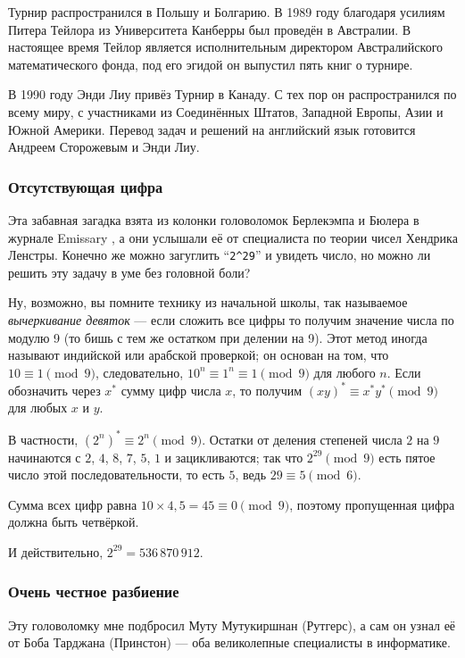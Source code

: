 Турнир распространился в Польшу и Болгарию.
В 1989 году благодаря усилиям Питера Тейлора из Университета Канберры был проведён в Австралии.
В настоящее время Тейлор является исполнительным директором Австралийского математического фонда, под его эгидой он выпустил пять книг о турнире.

В 1990 году Энди Лиу привёз Турнир в Канаду.
С тех пор он распространился по всему миру, с участниками из Соединённых Штатов, Западной Европы, Азии и Южной Америки.
Перевод задач и решений на английский язык готовится Андреем Сторожевым и Энди Лиу.

\subsubsection*{Отсутствующая цифра}

Эта забавная загадка взята из колонки головоломок Берлекэмпа и Бюлера в журнале Emissary \cite[весна/осень 2006 года]{3},
а они услышали её от специалиста по теории чисел Хендрика Ленстры.
Конечно же можно загуглить ``\texttt{2\^{}29}'' и увидеть число, но можно ли решить эту задачу в уме без головной боли?

Ну, возможно, вы помните технику из начальной школы, так называемое \emph{вычеркивание девяток} --- если сложить все цифры то получим значение числа по модулю 9 (то бишь с тем же остатком при делении на 9).
Этот метод иногда называют индийской или арабской проверкой;
он основан на том, что $10 \equiv 1 \pmod 9$, следовательно, $10^n \equiv 1^n \equiv 1 \pmod 9$ для любого $n$.
Если обозначить через $x^*$ сумму цифр числа $x$, то получим $(xy)^* \equiv x^* y^* \pmod 9$ для любых $x$ и $y$.

В частности, $(2^n)^* \equiv 2^n \pmod 9$.
Остатки от деления степеней числа $2$ на $9$ начинаются с $2$, $4$, $8$, $7$, $5$, $1$ и зацикливаются;
так что $2^{29} \pmod 9$ есть пятое число этой последовательности, то есть $5$, ведь $29 \equiv 5 \pmod 6$.

Сумма всех цифр равна $10 \times 4{,}5 = 45 \equiv 0 \pmod 9$, поэтому пропущенная цифра должна быть четвёркой.

И действительно, $2^{29} = 536\,870\,912$.

\subsubsection*{Очень честное разбиение}

Эту головоломку мне подбросил Муту Мутукиршнан (Рутгерс),
а сам он узнал её от Боба Тарджана (Принстон) — 
оба великолепные специалисты в информатике.

